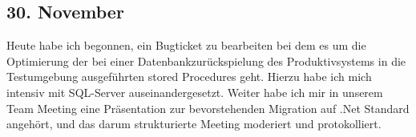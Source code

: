 \subsection{30. November}
Heute habe ich begonnen, ein Bugticket zu bearbeiten bei dem es um die Optimierung der bei einer Datenbankzurückspielung des Produktivsystems in die Testumgebung ausgeführten stored Procedures geht. Hierzu habe ich mich intensiv mit SQL-Server auseinandergesetzt. Weiter habe ich mir in unserem Team Meeting eine Präsentation zur bevorstehenden Migration auf .Net Standard angehört, und das darum strukturierte Meeting moderiert und protokolliert.